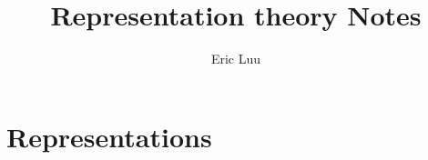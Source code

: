 \documentclass[]{article}
\title{Representation theory Notes}
\author{Eric Luu}
\theoremstyle{definition}
\numberwithin{theorem}{section}
\numberwithin{equation}{section}
\begin{document}
\maketitle
\section{Representations}
\end{document}
